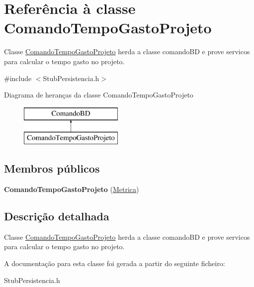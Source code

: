 \hypertarget{class_comando_tempo_gasto_projeto}{
\section{\-Referência à classe \-Comando\-Tempo\-Gasto\-Projeto}
\label{class_comando_tempo_gasto_projeto}
}


\-Classe \hyperlink{class_comando_tempo_gasto_projeto}{\-Comando\-Tempo\-Gasto\-Projeto} herda a classe comando\-B\-D e prove servicos para calcular o tempo gasto no projeto.  




{\ttfamily \#include $<$\-Stub\-Persistencia.\-h$>$}

\-Diagrama de heranças da classe \-Comando\-Tempo\-Gasto\-Projeto\begin{figure}[H]
\begin{center}
\leavevmode
\includegraphics[height=2.000000cm]{class_comando_tempo_gasto_projeto}
\end{center}
\end{figure}
\subsection*{\-Membros públicos}
\begin{DoxyCompactItemize}
\item 
\hypertarget{class_comando_tempo_gasto_projeto_addb63fa17cc29921c356b273addf411d}{
{\bfseries \-Comando\-Tempo\-Gasto\-Projeto} (\hyperlink{class_metrica}{\-Metrica})}
\label{class_comando_tempo_gasto_projeto_addb63fa17cc29921c356b273addf411d}

\end{DoxyCompactItemize}


\subsection{\-Descrição detalhada}
\-Classe \hyperlink{class_comando_tempo_gasto_projeto}{\-Comando\-Tempo\-Gasto\-Projeto} herda a classe comando\-B\-D e prove servicos para calcular o tempo gasto no projeto. 

\-A documentação para esta classe foi gerada a partir do seguinte ficheiro\-:\begin{DoxyCompactItemize}
\item 
\-Stub\-Persistencia.\-h\end{DoxyCompactItemize}
